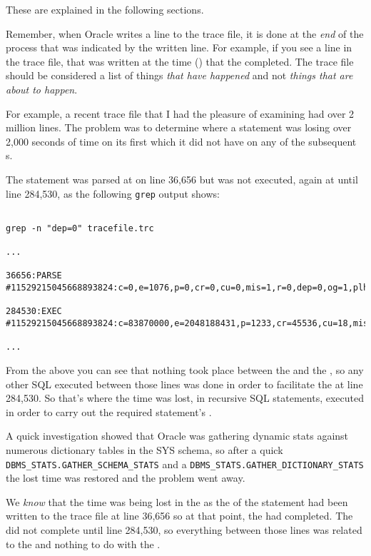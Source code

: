 These are explained in the following sections.

\begin{note}
Remember, when Oracle writes a line to the trace file, it is done at the \emph{end} of the process that was indicated by the written line. For example, if you see a  line in the trace file, that was written at the time () that the  completed. The trace file should be considered a list of things \emph{that have happened} and not \emph{things that are about to happen}.
\end{note}

For example, a recent trace file that I had the pleasure of examining had over 2 million lines. The problem was to determine where a statement was losing over 2,000 seconds of time on its first  which it did not have on any of the subsequent s.

The statement was parsed at  on line 36,656 but was not executed, again at  until line 284,530, as the following \texttt{grep} output shows:

\begin{lstlisting}[numbers=none,caption={Oracle 11g Problem Trace - \texttt{grep} output}]

grep -n "dep=0" tracefile.trc

...

36656:PARSE #11529215045668893824:c=0,e=1076,p=0,cr=0,cu=0,mis=1,r=0,dep=0,og=1,plh=0,tim=26375808573637

284530:EXEC #11529215045668893824:c=83870000,e=2048188431,p=1233,cr=45536,cu=18,mis=1,r=1,dep=0,og=1,plh=0,tim=26377856794348

...
\end{lstlisting}

From the above you can see that nothing took place between the  and the , so any other SQL executed between those lines was done in order to facilitate the  at line 284,530. So that's where the time was lost, in recursive SQL statements, executed in order to carry out the required statement's . 

A quick investigation showed that Oracle was gathering dynamic stats against numerous dictionary tables in the SYS schema, so after a quick \texttt{DBMS\_STATS.GATHER\_SCHEMA\_STATS} and a \texttt{DBMS\_STATS.GATHER\_DICTIONARY\_STATS} the lost time was restored and the problem went away.

We \emph{know} that the time was being lost in the  as the  of the statement had been written to the trace file at line 36,656 so at that point, the  had completed. The  did not complete until line 284,530, so everything between those lines was related to the  and nothing to do with the .

